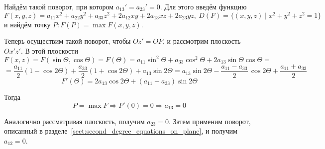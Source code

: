 Найдём такой поворот, при котором $a_{13}' = a_{23}' = 0$.
Для этого введём функцию
\begin{equation*}
F(x, y, z) = a_{11} x^2 + a_{22} y^2 + a_{33} z^2 + 2 a_{12} xy + 2 a_{13} xz + 2 a_{23} yz, \
D(F) = \{ (x, y, z) \mid x^2 + y^2 + z^2 = 1 \}
\end{equation*}
и найдём точку $P \colon F(P) = \max F(x, y, z)$.

Теперь осуществим такой поворот, чтобы $Oz' = OP$, и рассмотрим плоскость $Ox'z'$.
В этой плоскости
\begin{equation*}
F(x, z) =
F(\sin \Theta, \cos \Theta) =
F(\Theta) =
a_{11} \sin^2 \Theta + a_{33} \cos^2 \Theta + 2 a_{13} \sin \Theta \cos \Theta =
\end{equation*}
\begin{equation*}
= \frac{a_{11}}2 (1 - \cos 2\Theta) + \frac{a_{33}}2 (1 + \cos 2\Theta) + a_{13} \sin 2\Theta =
a_{13} \sin 2\Theta - \frac{a_{11} - a_{33}}2\,\cos 2\Theta + \frac{a_{11} + a_{33}}2
\end{equation*}
\begin{equation*}
F'(\Theta) = 2 a_{13} \cos 2\Theta + (a_{11} - a_{33}) \sin 2\Theta
\end{equation*}

Тогда
\begin{equation*}
P = \max F \Rightarrow
F'(0) = 0 \Rightarrow
a_{13} = 0
\end{equation*}

Аналогично рассматривая плоскость, получим $a_{23} = 0$.
Затем применим поворот, описанный в разделе~\ref{sect:second_degree_equations_on_plane}, и получим $a_{12} = 0$.

